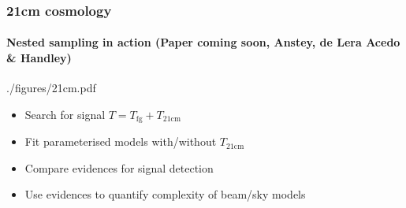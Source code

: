 \documentclass[%
]{beamer}
\begin{document}
\begin{frame}
  \frametitle{21cm cosmology}
  \framesubtitle{Nested sampling in action (Paper coming soon, Anstey, de Lera Acedo \& Handley)}
    \begin{figright}[0.3]{./figures/21cm.pdf}
        \begin{itemize}
            \item Search for signal  $T=T_\mathrm{fg} + T_\mathrm{21cm}$ 
            \item Fit parameterised models with/without $T_\mathrm{21cm}$
            \item Compare evidences for signal detection
            \item Use evidences to quantify complexity of beam/sky models
        \end{itemize}
    \end{figright}
\end{frame}
\end{document}

